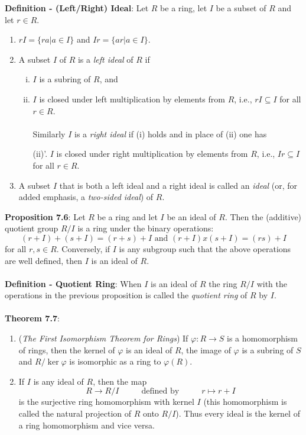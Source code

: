 \documentclass{article}
\begin{document}
\textbf{Definition - (Left/Right) Ideal}: Let $R$ be a ring, let $I$ be a subset of $R$ and let $r \in R$. \begin{enumerate}
    \item $rI = \{ra | a \in I\}$ and $Ir = \{ar | a \in I\}$. 
    \item A subset $I$ of $R$ is a \textit{left ideal} of $R$ if \begin{enumerate}[(i).]
        \item $I$ is a subring of $R$, and
        \item $I$ is closed under left multiplication by elements from $R$, i.e., $rI \subseteq I$ for all $r \in R$. \\ \\
        \hspace*{-1.2cm} Similarly $I$ is a \textit{right ideal} if (i) holds and in place of (ii) one has
        \item[(ii)'.] $I$ is closed under right multiplication by elements from $R$, i.e., $Ir \subseteq I$ for all $r \in R$. 
    \end{enumerate}
    \item A subset $I$ that is both a left ideal and a right ideal is called an \textit{ideal} (or, for added emphasis, a \textit{two-sided ideal}) of $R$. 
\end{enumerate} $ $ \\
\textbf{Proposition 7.6}: Let $R$ be a ring and let $I$ be an ideal of $R$. Then the (additive) quotient group $R/I$ is a ring under the binary operations: $$(r + I) + (s + I) = (r + s) + I \text{ and } (r + I) x (s + I) = (rs) + I$$ for all $r, s \in R$. Conversely, if $I$ is any subgroup such that the above operations are well defined, then $I$ is an ideal of $R$. \\ \\
\textbf{Definition - Quotient Ring}: When $I$ is an ideal of $R$ the ring $R/I$ with the operations in the previous proposition is called the \textit{quotient ring} of $R$ by $I$. \\ \\
\textbf{Theorem 7.7}: \begin{enumerate}
    \item (\textit{The First Isomorphism Theorem for Rings}) If $\varphi: R \rightarrow S$ is a homomorphism of rings, then the kernel of $\varphi$ is an ideal of $R$, the image of $\varphi$ is a subring of $S$ and $R/\ker \varphi$ is isomorphic as a ring to $\varphi(R)$.
    \item If $I$ is any ideal of $R$, then the map $$R \rightarrow R/I \hspace{1cm} \text{ defined by } \hspace{1cm} r \mapsto r + I $$ is the surjective ring homomorphism with kernel $I$ (this homomorphism is called the natural projection of $R$ onto $R/I$). Thus every ideal is the kernel of a ring homomorphism and vice versa. 
\end{enumerate} $ $ \\
\end{document}
